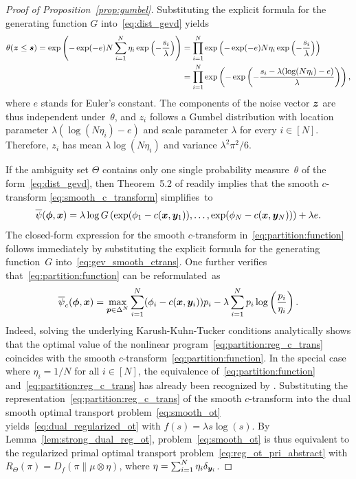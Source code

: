 \documentclass[11pt, a4paper, oneside, reqno]{article}
\begin{document}
	\begin{proof}[Proof of Proposition~\ref{prop:gumbel}]
		Substituting the explicit formula for the generating function $G$ into~\eqref{eq:dist_gevd} yields 
		\begin{align*}
		\theta(\boldsymbol z \leq \boldsymbol s) = \exp\left(-\exp(-e)N\sum\limits_{i=1}^N \eta_i \exp\left(-\frac{s_i}{\lambda}\right)\right) &=\prod\limits_{i=1}^N  \exp\left(-\exp(-e)N\eta_i \exp\left(-\frac{s_i}{\lambda}
		\right)\right)\\
		&= \prod\limits_{i=1}^N \exp\left(-\exp\left(-\frac{s_i - \lambda(\log(N\eta_i)-e)}{\lambda}\right)\right),
		\end{align*}
		where $e$ stands for Euler's constant. The components of the noise vector $\boldsymbol z$ are thus  independent under~$\theta$, and $z_i$ follows a Gumbel distribution with location parameter $\lambda(\log(N\eta_i)-e)$ and scale parameter $\lambda$ for every $i \in [N]$. Therefore, $z_i$ has mean $\lambda \log(N \eta_i)$ and variance $\lambda^2 \pi^2/6$. 
		
		If the ambiguity set $\Theta$ contains only one single probability measure~$\theta$ of the form~\eqref{eq:dist_gevd}, then Theorem~5.2 of \citet{mcfadden1981econometric} readily implies that the smooth $c$-transform \eqref{eq:smooth_c_transform} simplifies~to
		\begin{equation}
		\label{eq:gev_smooth_ctrans}
		\overline\psi(\boldsymbol \phi , \boldsymbol x) = \lambda \log G \left(\exp(\phi_1 -c(\boldsymbol x,\boldsymbol y_1)),\dots, \exp(\phi_N - c(\boldsymbol x, \boldsymbol {y}_N)) \right) + \lambda e.
		\end{equation}
		The closed-form expression for the smooth $c$-transform in~\eqref{eq:partition:function} follows immediately by substituting the explicit formula for the generating function~$G$ into~\eqref{eq:gev_smooth_ctrans}. One further verifies that~\eqref{eq:partition:function} can be reformulated~as
		\begin{equation}
		\label{eq:partition:reg_c_trans}
		\overline{\psi}_c(\boldsymbol \phi, \boldsymbol x) = \max\limits_{\boldsymbol p \in \Delta^N} \sum\limits_{i=1}^N (\phi_i - c(\boldsymbol x, \boldsymbol y_i)) p_i - \lambda \sum\limits_{i=1}^N p_i \log\left(\frac{p_i}{\eta_i}\right).
		\end{equation}  
		Indeed, solving the underlying Karush-Kuhn-Tucker conditions analytically shows that the optimal value of the nonlinear program~\eqref{eq:partition:reg_c_trans} coincides with the smooth $c$-transform~\eqref{eq:partition:function}. In the special case where $\eta_i = 1/N$ for all $i \in [N]$, the equivalence of~\eqref{eq:partition:function} and~\eqref{eq:partition:reg_c_trans} has already been recognized by \citet{anderson1988representative}. Substituting the representation~\eqref{eq:partition:reg_c_trans} of the smooth $c$-transform into the dual smooth optimal transport problem~\eqref{eq:smooth_ot} yields~\eqref{eq:dual_regularized_ot} with $f(s)= \lambda s \log(s)$. By Lemma~\ref{lem:strong_dual_reg_ot}, problem~\eqref{eq:smooth_ot} is thus equivalent to the regularized primal optimal transport problem~\eqref{eq:reg_ot_pri_abstract} with $R_\Theta(\pi) = D_f(\pi \| \mu \otimes \eta)$, where $\eta = \sum_{i =1}^N \eta_i \delta_{\boldsymbol y_i}$.
	\end{proof}
\end{document}
